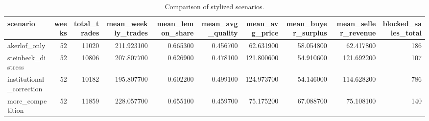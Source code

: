 \begin{table}
\caption{Comparison of stylized scenarios.}
\label{tab:scenario_comparison_summary}
\begin{tabular}{lrrrrrrrrr}
\toprule
scenario & weeks & total\_trades & mean\_weekly\_trades & mean\_lemon\_share & mean\_avg\_quality & mean\_avg\_price & mean\_buyer\_surplus & mean\_seller\_revenue & blocked\_sales\_total \\
\midrule
akerlof\_only & 52 & 11020 & 211.923100 & 0.665300 & 0.456700 & 62.631900 & 58.054800 & 62.417800 & 186 \\
steinbeck\_distress & 52 & 10806 & 207.807700 & 0.626900 & 0.478100 & 121.800600 & 54.910600 & 121.692200 & 107 \\
institutional\_correction & 52 & 10182 & 195.807700 & 0.602200 & 0.499100 & 124.973700 & 54.146000 & 114.628200 & 786 \\
more\_competition & 52 & 11859 & 228.057700 & 0.655100 & 0.459700 & 75.175200 & 67.088700 & 75.108100 & 140 \\
\bottomrule
\end{tabular}
\end{table}
